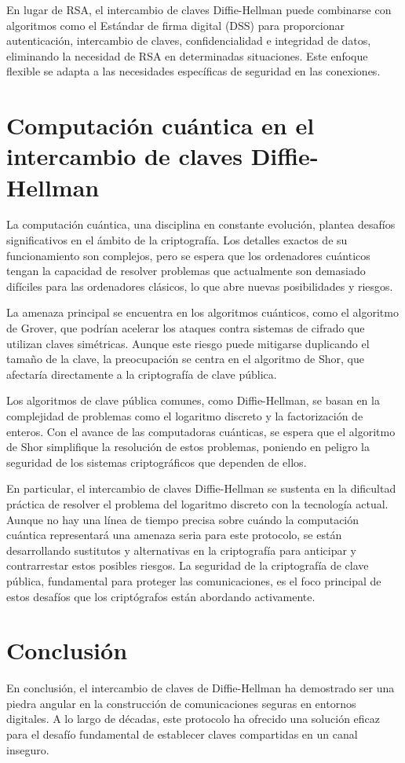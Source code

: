 \documentclass[11pt]{article}
\begin{document}
En lugar de RSA, el intercambio de claves Diffie-Hellman puede combinarse con algoritmos como el Estándar de firma digital (DSS) para proporcionar autenticación, intercambio de claves, confidencialidad e integridad de datos, eliminando la necesidad de RSA en determinadas situaciones. Este enfoque flexible se adapta a las necesidades específicas de seguridad en las conexiones.


\section{Computación cuántica en el intercambio de claves Diffie-Hellman}

La computación cuántica, una disciplina en constante evolución, plantea desafíos significativos en el ámbito de la criptografía. Los detalles exactos de su funcionamiento son complejos, pero se espera que los ordenadores cuánticos tengan la capacidad de resolver problemas que actualmente son demasiado difíciles para las ordenadores clásicos, lo que abre nuevas posibilidades y riesgos.

La amenaza principal se encuentra en los algoritmos cuánticos, como el algoritmo de Grover, que podrían acelerar los ataques contra sistemas de cifrado que utilizan claves simétricas. Aunque este riesgo puede mitigarse duplicando el tamaño de la clave, la preocupación se centra en el algoritmo de Shor, que afectaría directamente a la criptografía de clave pública.

Los algoritmos de clave pública comunes, como Diffie-Hellman, se basan en la complejidad de problemas como el logaritmo discreto y la factorización de enteros. Con el avance de las computadoras cuánticas, se espera que el algoritmo de Shor simplifique la resolución de estos problemas, poniendo en peligro la seguridad de los sistemas criptográficos que dependen de ellos.

En particular, el intercambio de claves Diffie-Hellman se sustenta en la dificultad práctica de resolver el problema del logaritmo discreto con la tecnología actual. Aunque no hay una línea de tiempo precisa sobre cuándo la computación cuántica representará una amenaza seria para este protocolo, se están desarrollando sustitutos y alternativas en la criptografía para anticipar y contrarrestar estos posibles riesgos. La seguridad de la criptografía de clave pública, fundamental para proteger las comunicaciones, es el foco principal de estos desafíos que los criptógrafos están abordando activamente.

\section{Conclusión}
En conclusión, el intercambio de claves de Diffie-Hellman ha demostrado ser una piedra angular en la construcción de comunicaciones seguras en entornos digitales. A lo largo de décadas, este protocolo ha ofrecido una solución eficaz para el desafío fundamental de establecer claves compartidas en un canal inseguro.
\end{document}

